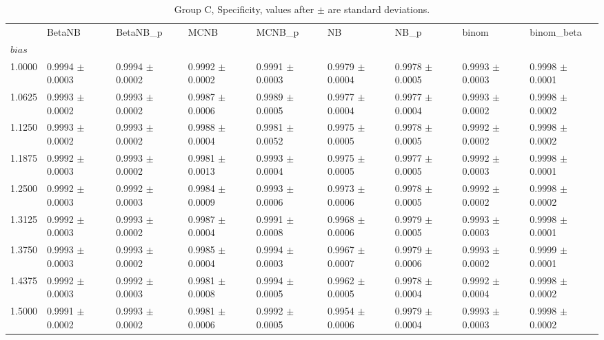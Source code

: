 \begin{table}[H]
\centering
\begin{adjustbox}{max width=\linewidth}
\begin{tabular}{lllllllll}
\toprule
 & BetaNB & BetaNB\_p & MCNB & MCNB\_p & NB & NB\_p & binom & binom\_beta \\
$bias$ &  &  &  &  &  &  &  &  \\
\midrule
1.0000 & 0.9994 $\pm$ 0.0003 & 0.9994 $\pm$ 0.0002 & 0.9992 $\pm$ 0.0002 & 0.9991 $\pm$ 0.0003 & 0.9979 $\pm$ 0.0004 & 0.9978 $\pm$ 0.0005 & 0.9993 $\pm$ 0.0003 & 0.9998 $\pm$ 0.0001 \\
1.0625 & 0.9993 $\pm$ 0.0002 & 0.9993 $\pm$ 0.0002 & 0.9987 $\pm$ 0.0006 & 0.9989 $\pm$ 0.0005 & 0.9977 $\pm$ 0.0004 & 0.9977 $\pm$ 0.0004 & 0.9993 $\pm$ 0.0002 & 0.9998 $\pm$ 0.0002 \\
1.1250 & 0.9993 $\pm$ 0.0002 & 0.9993 $\pm$ 0.0002 & 0.9988 $\pm$ 0.0004 & 0.9981 $\pm$ 0.0052 & 0.9975 $\pm$ 0.0005 & 0.9978 $\pm$ 0.0005 & 0.9992 $\pm$ 0.0002 & 0.9998 $\pm$ 0.0002 \\
1.1875 & 0.9992 $\pm$ 0.0003 & 0.9993 $\pm$ 0.0002 & 0.9981 $\pm$ 0.0013 & 0.9993 $\pm$ 0.0004 & 0.9975 $\pm$ 0.0005 & 0.9977 $\pm$ 0.0005 & 0.9992 $\pm$ 0.0003 & 0.9998 $\pm$ 0.0001 \\
1.2500 & 0.9992 $\pm$ 0.0003 & 0.9992 $\pm$ 0.0003 & 0.9984 $\pm$ 0.0009 & 0.9993 $\pm$ 0.0006 & 0.9973 $\pm$ 0.0006 & 0.9978 $\pm$ 0.0005 & 0.9992 $\pm$ 0.0002 & 0.9998 $\pm$ 0.0002 \\
1.3125 & 0.9992 $\pm$ 0.0003 & 0.9993 $\pm$ 0.0002 & 0.9987 $\pm$ 0.0004 & 0.9991 $\pm$ 0.0008 & 0.9968 $\pm$ 0.0006 & 0.9979 $\pm$ 0.0005 & 0.9993 $\pm$ 0.0003 & 0.9998 $\pm$ 0.0001 \\
1.3750 & 0.9993 $\pm$ 0.0003 & 0.9993 $\pm$ 0.0002 & 0.9985 $\pm$ 0.0004 & 0.9994 $\pm$ 0.0003 & 0.9967 $\pm$ 0.0007 & 0.9979 $\pm$ 0.0006 & 0.9993 $\pm$ 0.0002 & 0.9999 $\pm$ 0.0001 \\
1.4375 & 0.9992 $\pm$ 0.0003 & 0.9992 $\pm$ 0.0003 & 0.9981 $\pm$ 0.0008 & 0.9994 $\pm$ 0.0005 & 0.9962 $\pm$ 0.0005 & 0.9978 $\pm$ 0.0004 & 0.9992 $\pm$ 0.0004 & 0.9998 $\pm$ 0.0002 \\
1.5000 & 0.9991 $\pm$ 0.0002 & 0.9993 $\pm$ 0.0002 & 0.9981 $\pm$ 0.0006 & 0.9992 $\pm$ 0.0005 & 0.9954 $\pm$ 0.0006 & 0.9979 $\pm$ 0.0004 & 0.9993 $\pm$ 0.0003 & 0.9998 $\pm$ 0.0002 \\
\bottomrule
\end{tabular}

\end{adjustbox}
\caption{Group C, Specificity, values after $\pm$ are standard deviations.}
\end{table}
